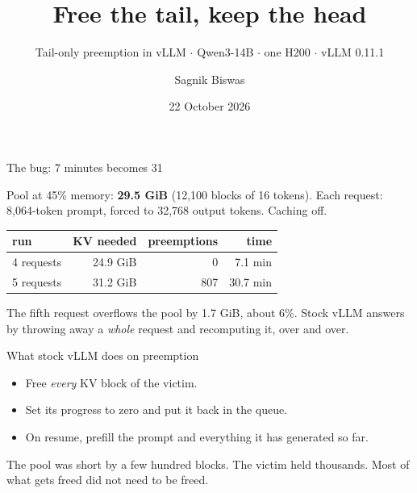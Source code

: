 \documentclass[aspectratio=169]{beamer}
\title{Free the tail, keep the head}
\subtitle{Tail-only preemption in vLLM $\cdot$ Qwen3-14B $\cdot$ one H200 $\cdot$ vLLM 0.11.1}
\author{Sagnik Biswas}
\date{22 October 2026}
\begin{document}
\begin{frame}
\titlepage
\end{frame}

\begin{frame}{The bug: 7 minutes becomes 31}

Pool at 45\% memory: \textbf{29.5 GiB} (12{,}100 blocks of 16 tokens).
Each request: 8{,}064-token prompt, forced to 32{,}768 output tokens. Caching off.

\begin{center}
\begin{tabular}{lrrr}
\toprule
run & KV needed & preemptions & time \\
\midrule
4 requests & 24.9 GiB & 0 & 7.1 min \\
5 requests & 31.2 GiB & 807 & 30.7 min \\
\bottomrule
\end{tabular}
\end{center}

The fifth request overflows the pool by 1.7 GiB, about 6\%.
Stock vLLM answers by throwing away a \emph{whole} request and recomputing it, over and over.

\end{frame}

\begin{frame}{What stock vLLM does on preemption}

\begin{itemize}
  \item Free \emph{every} KV block of the victim.
  \item Set its progress to zero and put it back in the queue.
  \item On resume, prefill the prompt and everything it has generated so far.
\end{itemize}

\vspace{0.5em}
The pool was short by a few hundred blocks. The victim held thousands.
Most of what gets freed did not need to be freed.

\end{frame}
\end{document}

